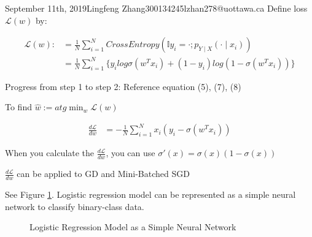 \documentclass{article}
\begin{document}
\begin{lecture}{September 11th, 2019}{Lingfeng Zhang}{300134245}{lzhan278@uottawa.ca}
Define loss $\mathcal{L}(w)$ by:

\begin{align}
\mathcal{L}(w) :&= \frac{1}{N} \sum_{i=1}^N CrossEntropy(\mathbb{I}{y_i=\cdot};p_{Y\mid X}(\cdot \mid x_i)) \\
&= \frac{1}{N} \sum_{i=1}^N \{y_i log \sigma(w^T x_i)+(1-y_i) log (1-\sigma(w^Tx_i))\} \nonumber
\end{align}

Progress from step 1 to step 2:  Reference equation (5), (7), (8)

To find $\hat w := atg\min_w \mathcal{L}(w)$

\begin{align}
\frac{d\mathcal{L}}{dw} &= -\frac{1}{N}\sum_{i=1}^Nx_i(y_i-\sigma(w^Tx_i))
\end{align}

When you calculate the $\frac{d\mathcal{L}}{dw}$, you can use $\sigma'(x) = \sigma(x)(1-\sigma(x))$

$\frac{d\mathcal{L}}{dw}$ can be applied to GD and Mini-Batched SGD

See Figure \ref{fig:logisticRegressionNN}. Logistic regression model can be represented as a simple neural network to classify binary-class data.

\begin{figure}[ht!]
\centering
{}
\caption{Logistic Regression Model as a Simple Neural Network}
\label{fig:logisticRegressionNN}
\end{figure}


\end{lecture}
\end{document}
